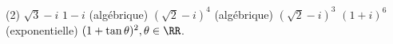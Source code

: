 %
%
	\begin{tasks}(2)
		\task $\sqrt{3} - i$
		\task $1 - i$
		\task (algébrique) $(\sqrt{2} - i)^4$
		\task (algébrique) $(\sqrt{2} - i)^3$
		\task $(1+i)^6$
		\task (exponentielle)	$ (1 + \tan{\theta})^2, \theta \in \RR$.
	\end{tasks}
